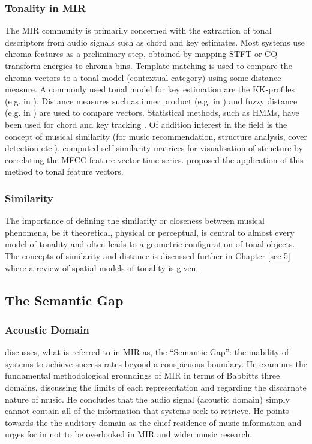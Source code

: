 \documentclass{article}
\begin{document}
\subsubsection{Tonality in MIR}
\label{sec-2-2-2}

The MIR community is primarily concerned with the extraction of tonal
descriptors from audio signals such as chord and key estimates. Most
systems use chroma features as a preliminary step, obtained by mapping
STFT or CQ transform energies to chroma bins. Template matching is
used to compare the chroma vectors to a tonal model (contextual
category) using some distance measure. A commonly used tonal model for
key estimation are the KK-profiles \citep{Krumhansl1990} (e.g. in
\citealt{Gomez2006}). Distance measures such as inner product (e.g. in
\citealt{Gomez2006}) and fuzzy distance (e.g. in
\citealt{Purwins2000}) are used to compare vectors. Statistical
methods, such as HMMs, have been used for chord and key tracking
\citep{Chai2005}. Of addition interest in the field is the concept of
musical similarity (for music recommendation, structure analysis,
cover detection etc.). \citet{Foote2000} computed self-similarity
matrices for visualisation of structure by correlating the MFCC
feature vector time-series. \citet{Gomez2006} proposed the application
of this method to tonal feature vectors.
\subsubsection{Similarity}
\label{sec-2-2-3}

The importance of defining the similarity or closeness between musical
phenomena, be it theoretical, physical or perceptual, is central to
almost every model of tonality and often leads to a geometric
configuration of tonal objects. The concepts of similarity and
distance is discussed further in Chapter \ref{sec-5}
where a review of spatial models of tonality is given.
\subsection{The Semantic Gap}
\label{sec-2-3}
\subsubsection{Acoustic Domain}
\label{sec-2-3-1}

\citet{Wiggins2009} discusses, what is referred to in MIR as, the
``Semantic Gap'': the inability of systems to achieve success rates
beyond a conspicuous boundary. He examines the fundamental
methodological groundings of MIR in terms of Babbitts three domains,
discussing the limits of each representation and regarding the
discarnate nature of music. He concludes that the audio signal
(acoustic domain) simply cannot contain all of the information that
systems seek to retrieve. He points towards the the auditory domain as
the chief residence of music information and urges for in not to be
overlooked in MIR and wider music research.
\end{document}
